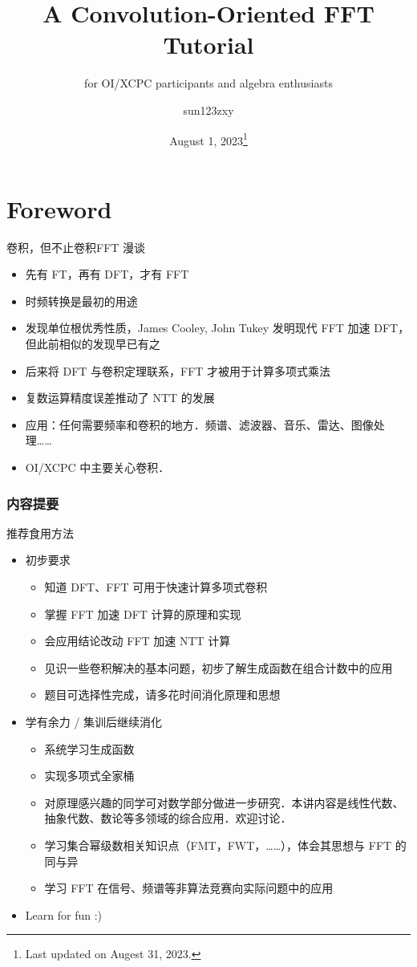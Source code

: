 \documentclass[fontset=fandol]{ctexbeamer}
\title{A Convolution-Oriented FFT Tutorial}
\subtitle{for OI/XCPC participants and algebra enthusiasts}
\author{sun123zxy}
\institute{BITACMCLUB}
\date{August 1, 2023\thanks{Last updated on Augest 31, 2023.}}
\begin{document}
\frame{\titlepage}

\section{Foreword}

\begin{frame}{卷积，但不止卷积}{FFT 漫谈}

\begin{itemize}
    \item 先有 FT，再有 DFT，才有 FFT
    \item 时频转换是最初的用途
    \item 发现单位根优秀性质，James Cooley, John Tukey 发明现代 FFT 加速 DFT，但此前相似的发现早已有之
    \item 后来将 DFT 与卷积定理联系，FFT 才被用于计算多项式乘法
    \item 复数运算精度误差推动了 NTT 的发展
    \item 应用：任何需要频率和卷积的地方．频谱、滤波器、音乐、雷达、图像处理……
    \item OI/XCPC 中主要关心卷积．
\end{itemize}

\end{frame}

\begin{frame}
\frametitle{内容提要}
\tableofcontents
\end{frame}

\begin{frame}{推荐食用方法}
\begin{itemize}
    \item 初步要求
    \begin{itemize}
        \item 知道 DFT、FFT 可用于快速计算多项式卷积
        \item 掌握 FFT 加速 DFT 计算的原理和实现
        \item 会应用结论改动 FFT 加速 NTT 计算
        \item 见识一些卷积解决的基本问题，初步了解生成函数在组合计数中的应用
        \item 题目可选择性完成，请多花时间消化原理和思想
    \end{itemize}
    \item 学有余力 / 集训后继续消化
    \begin{itemize}
        \item 系统学习生成函数
        \item 实现多项式全家桶
        \item 对原理感兴趣的同学可对数学部分做进一步研究．本讲内容是线性代数、抽象代数、数论等多领域的综合应用．欢迎讨论．
        \item 学习集合幂级数相关知识点（FMT，FWT，……），体会其思想与 FFT 的同与异
        \item 学习 FFT 在信号、频谱等非算法竞赛向实际问题中的应用
    \end{itemize}
    \item Learn for fun :)
\end{itemize}
\end{frame}
\end{document}
